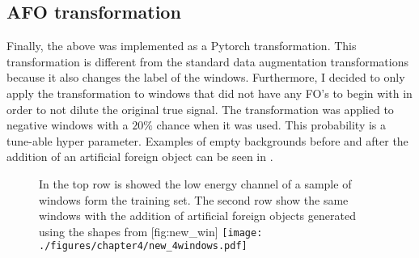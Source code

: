 \subsection{AFO transformation}
Finally, the above was implemented as a Pytorch transformation.
This transformation is different from the standard data augmentation transformations because it also changes the label of the windows. 
Furthermore, I decided to only apply the transformation to windows that did not have any FO's to begin with in order to not dilute the original true signal.
The transformation was applied to negative windows with a $20\%$ chance when it was used. This probability is a tune-able hyper parameter.
Examples of empty backgrounds before and after the addition of an artificial foreign object can be seen in .

\begin{figure}[h]
	\begin{sidecaption}{In the top row is showed the low energy channel of a sample of windows form the training set. The second row show the same windows with the addition of artificial foreign objects generated using the shapes from }[fig:new_win]
		\centering
		\texttt{[image: ./figures/chapter4/new\_4windows.pdf]}
	\end{sidecaption}
\end{figure}
